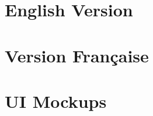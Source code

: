 \documentclass[a4paper]{article}
\begin{document}

\tableofcontents

\pagebreak

\section{English Version}


\section{Version Française}


\pagebreak

\section{UI Mockups}


\end{document}
